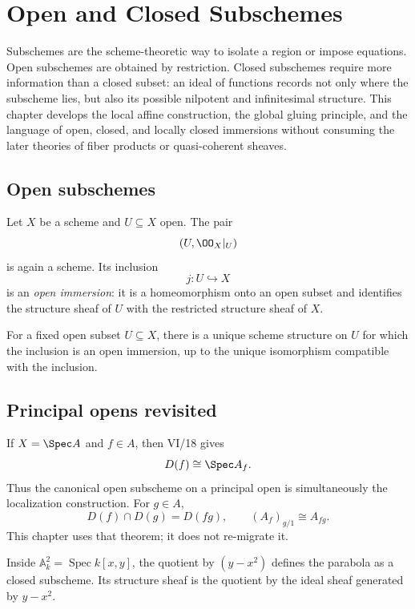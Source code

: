 \chapter{Open and Closed Subschemes}\label{ch:vi22-open-closed-subschemes}

Subschemes are the scheme-theoretic way to isolate a region or impose equations.  Open
subschemes are obtained by restriction.  Closed subschemes require more information than a
closed subset: an ideal of functions records not only where the subscheme lies, but also its
possible nilpotent and infinitesimal structure.  This chapter develops the local affine
construction, the global gluing principle, and the language of open, closed, and locally closed
immersions without consuming the later theories of fiber products or quasi-coherent sheaves.

\section{Open subschemes}
Let $X$ be a scheme and $U\subseteq X$ open.  The pair
\[
 (U,\OO_X|_U)
\]
is again a scheme.  Its inclusion
\[
 j:U\hookrightarrow X
\]
is an \emph{open immersion}: it is a homeomorphism onto an open subset and identifies the
structure sheaf of $U$ with the restricted structure sheaf of $X$.

\begin{proposition}\label{prop:vi22-open-unique}
For a fixed open subset $U\subseteq X$, there is a unique scheme structure on $U$ for which the
inclusion is an open immersion, up to the unique isomorphism compatible with the inclusion.
\end{proposition}



\section{Principal opens revisited}
If $X=\Spec A$ and $f\in A$, then VI/18 gives
\[
 D(f)\cong \Spec A_f.
\]
Thus the canonical open subscheme on a principal open is simultaneously the localization
construction.  For $g\in A$,
\[
 D(f)\cap D(g)=D(fg),\qquad (A_f)_{g/1}\cong A_{fg}.
\]
This chapter uses that theorem; it does not re-migrate it.



\begin{example}\label{ex:vi22-expand-01}
Inside $\mathbb A^2_k=\operatorname{Spec}k[x,y]$, the quotient by $(y-x^2)$ defines the parabola as a closed subscheme.  Its structure sheaf is the quotient by the ideal sheaf generated by $y-x^2$.
\end{example}

